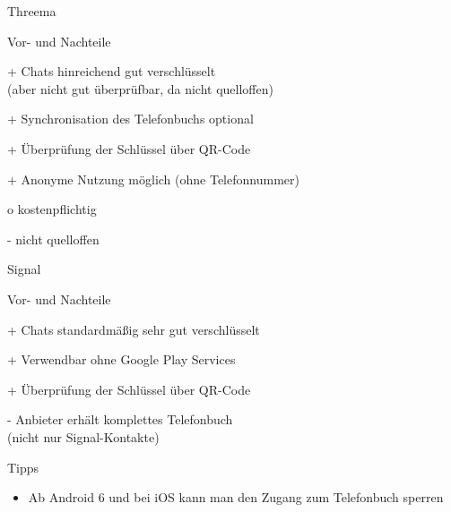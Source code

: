 \begin{frame}{Threema}
  \begin{blex}{Vor- und Nachteile}
    \item[+] Chats hinreichend gut verschlüsselt\\(aber nicht gut überprüfbar, da nicht quelloffen)
    \item[+] Synchronisation des Telefonbuchs optional
    \item[+] Überprüfung der Schlüssel über QR-Code
    \item[+] Anonyme Nutzung möglich (ohne Telefonnummer)
    \item[o] kostenpflichtig
    \item[-] nicht quelloffen
  \end{blex}
\end{frame}

\begin{frame}{Signal}
  \begin{blex}{Vor- und Nachteile}
    \item[+] Chats standardmäßig sehr gut verschlüsselt
    \item[+] Verwendbar ohne Google Play Services %
    \item[+] Überprüfung der Schlüssel über QR-Code
    \item[-] Anbieter erhält komplettes Telefonbuch\\ (nicht nur Signal-Kontakte)
  \end{blex}
  \begin{block}{Tipps}
    \begin{itemize}
      \item Ab Android 6 und bei iOS kann man den Zugang zum Telefonbuch sperren
    \end{itemize}
  \end{block}
\end{frame}

